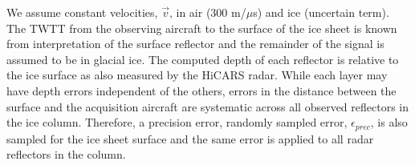 We assume constant velocities, $\vec{v}$, in air (300 m/${\mu}$s) and ice (uncertain term). The TWTT from the observing aircraft to the surface of the ice sheet is known from interpretation of the surface reflector and the remainder of the signal is assumed to be in glacial ice. The computed depth of each reflector is relative to the ice surface as also measured by the HiCARS radar. While each layer may have depth errors independent of the others, errors in the distance between the surface and the acquisition aircraft are systematic across all observed reflectors in the ice column. Therefore, a precision error, randomly sampled error, $\epsilon_{prec}$, is also sampled for the ice sheet surface and the same error is applied to all radar reflectors in the column. 







